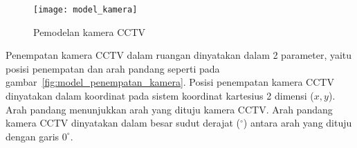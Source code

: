 

\begin{figure}[h]
	\centering  
	\texttt{[image: model\_kamera]}
	\caption[Pemodelan kamera CCTV]{Pemodelan kamera CCTV} 
	\label{fig:model_kamera}
\end{figure}

Penempatan kamera CCTV dalam ruangan dinyatakan dalam 2 parameter, yaitu posisi penempatan dan arah pandang seperti pada gambar~\ref{fig:model_penempatan_kamera}. Posisi penempatan kamera CCTV dinyatakan dalam koordinat pada sistem koordinat kartesius 2 dimensi (\(x,y\)). Arah pandang menunjukkan arah yang dituju kamera CCTV. Arah pandang kamera CCTV dinyatakan dalam besar sudut derajat (\(^\circ\)) antara arah yang dituju dengan garis \(0^\circ\).



